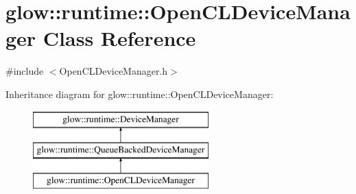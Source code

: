 \hypertarget{classglow_1_1runtime_1_1_open_c_l_device_manager}{}\section{glow\+:\+:runtime\+:\+:Open\+C\+L\+Device\+Manager Class Reference}
\label{classglow_1_1runtime_1_1_open_c_l_device_manager}


{\ttfamily \#include $<$Open\+C\+L\+Device\+Manager.\+h$>$}

Inheritance diagram for glow\+:\+:runtime\+:\+:Open\+C\+L\+Device\+Manager\+:\begin{figure}[H]
\begin{center}
\leavevmode
\includegraphics[height=3.000000cm]{classglow_1_1runtime_1_1_open_c_l_device_manager}
\end{center}
\end{figure}
